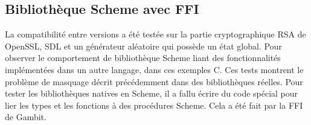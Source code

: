%
%
%
%



\clearpage
%
\subsection{Bibliothèque Scheme avec FFI}
%
La compatibilité entre versions a été testée sur la partie cryptographique RSA
de OpenSSL, SDL et un générateur aléatoire qui possède un état global.  Pour
observer le comportement de bibliothèque Scheme liant des fonctionnalités
implémentées dans un autre langage, dans ces exemples C. Ces tests montrent le
problème de masquage décrit précédemment dans des bibliothèques réelles.  Pour
tester les bibliothèques natives en Scheme, il a fallu écrire du code spécial
pour lier les types et les fonctions à des procédures Scheme. Cela a été fait
par la FFI de Gambit.


